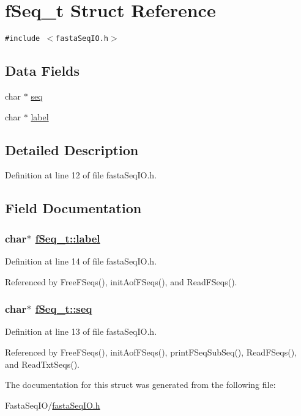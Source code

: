 \hypertarget{structfSeq__t}{
\section{f\-Seq\_\-t Struct Reference}
\label{structfSeq__t}
}
{\tt \#include $<$fasta\-Seq\-IO.h$>$}

\subsection*{Data Fields}
\begin{CompactItemize}
\item 
char $\ast$ \hyperlink{structfSeq__t_o0}{seq}
\item 
char $\ast$ \hyperlink{structfSeq__t_o1}{label}
\end{CompactItemize}


\subsection*{Detailed Description}




Definition at line 12 of file fasta\-Seq\-IO.h.

\subsection*{Field Documentation}
\hypertarget{structfSeq__t_o1}{
\subsubsection[label]{\setlength{\rightskip}{0pt plus 5cm}char$\ast$ \hyperlink{structfSeq__t_o1}{f\-Seq\_\-t::label}}}
\label{structfSeq__t_o1}




Definition at line 14 of file fasta\-Seq\-IO.h.

Referenced by Free\-FSeqs(), init\-Aof\-FSeqs(), and Read\-FSeqs().\hypertarget{structfSeq__t_o0}{
\subsubsection[seq]{\setlength{\rightskip}{0pt plus 5cm}char$\ast$ \hyperlink{structfSeq__t_o0}{f\-Seq\_\-t::seq}}}
\label{structfSeq__t_o0}




Definition at line 13 of file fasta\-Seq\-IO.h.

Referenced by Free\-FSeqs(), init\-Aof\-FSeqs(), print\-FSeq\-Sub\-Seq(), Read\-FSeqs(), and Read\-Txt\-Seqs().

The documentation for this struct was generated from the following file:\begin{CompactItemize}
\item 
Fasta\-Seq\-IO/\hyperlink{fastaSeqIO_8h}{fasta\-Seq\-IO.h}\end{CompactItemize}
